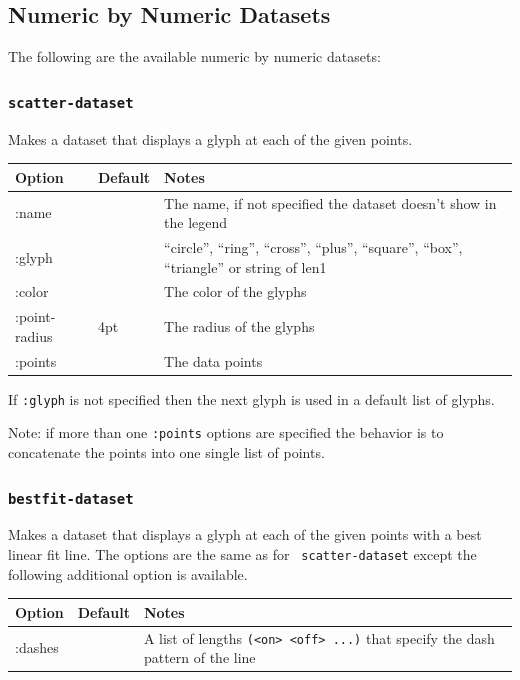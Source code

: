 \documentclass{article}
\begin{document}
\subsection{Numeric by Numeric Datasets}

The following are the available numeric by numeric datasets:

\subsubsection{\tt scatter-dataset}

Makes a dataset that displays a glyph at each of the given points.

\begin{center}
\begin{tabular}{lll}
Option & Default & Notes \\
\hline
:name & & The name, if not specified the dataset doesn't show in
the legend\\
:glyph & & ``circle'', ``ring'', ``cross'', ``plus'', ``square'',
``box'', ``triangle'' or string of len1\\
:color & & The color of the glyphs\\
:point-radius & 4pt & The radius of the glyphs\\
:points & & The data points\\
\end{tabular}
\end{center}

If {\tt :glyph} is not specified then the next glyph is used in a
default list of glyphs.

Note: if more than one {\tt :points} options are specified the
behavior is to concatenate the points into one single list of points.

\subsubsection{\tt bestfit-dataset}

Makes a dataset that displays a glyph at each of the given points with
a best linear fit line.  The options are the same as for {\tt
  scatter-dataset} except the following additional option is
available.

\begin{center}
\begin{tabular}{lll}
Option & Default & Notes \\
\hline
:dashes & & A list of lengths {\tt (<on> <off> ...)} that specify the
dash pattern of the line\\
\end{tabular}
\end{center}
\end{document}
